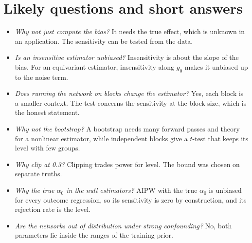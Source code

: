 \documentclass[10pt]{article}
\begin{document}
\section*{Likely questions and short answers}
\begin{itemize}
\item \textit{Why not just compute the bias?} It needs the true effect, which is unknown in an application. The
sensitivity can be tested from the data.
\item \textit{Is an insensitive estimator unbiased?} Insensitivity is about the slope of the bias. For an equivariant
estimator, insensitivity along $g_0$ makes it unbiased up to the noise term.
\item \textit{Does running the network on blocks change the estimator?} Yes, each block is a smaller context. The test
concerns the sensitivity at the block size, which is the honest statement.
\item \textit{Why not the bootstrap?} A bootstrap needs many forward passes and theory for a nonlinear estimator, while
independent blocks give a $t$-test that keeps its level with few groups.
\item \textit{Why clip at 0.3?} Clipping trades power for level. The bound was chosen on separate truths.
\item \textit{Why the true $\alpha_0$ in the null estimators?} AIPW with the true $\alpha_0$ is unbiased for every
outcome regression, so its sensitivity is zero by construction, and its rejection rate is the level.
\item \textit{Are the networks out of distribution under strong confounding?} No, both parameters lie inside the
ranges of the training prior.
\end{itemize}
\end{document}
